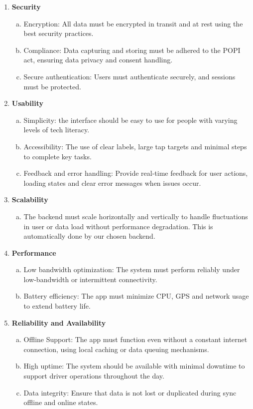 \documentclass[a4paper,12pt]{article}
\begin{document}
\begin{enumerate}
    \item \textbf{Security}
    \begin{enumerate}[a.]
        \item Encryption: All data must be encrypted in transit and at rest using the best security practices.
        \item Compliance: Data capturing and storing must be adhered to the POPI act, ensuring data privacy and consent handling.
        \item Secure authentication: Users must authenticate securely, and sessions must be protected.
    \end{enumerate}

    \item \textbf{Usability}
    \begin{enumerate}[a.]
        \item Simplicity: the interface should be easy to use for people with varying levels of tech literacy.
        \item Accessibility: The use of clear labels, large tap targets and minimal steps to complete key tasks.
        \item Feedback and error handling: Provide real-time feedback for user actions, loading states and clear error messages when issues occur.
    \end{enumerate}

    \item \textbf{Scalability}
    \begin{enumerate}[a.]
        \item The backend must scale horizontally and vertically to handle fluctuations in user or data load without performance degradation. This is automatically done by our chosen backend.
    \end{enumerate}

    \item \textbf{Performance}
    \begin{enumerate}[a.]
        \item Low bandwidth optimization: The system must perform reliably under low-bandwidth or intermittent connectivity.
        \item Battery efficiency: The app must minimize CPU, GPS and network usage to extend battery life.
    \end{enumerate}

    \item \textbf{Reliability and Availability}
    \begin{enumerate}[a.]
        \item Offline Support: The app must function even without a constant internet connection, using local caching or data queuing mechanisms.
        \item High uptime: The system should be available with minimal downtime to support driver operations throughout the day.
        \item Data integrity: Ensure that data is not lost or duplicated during sync offline and online states.
    \end{enumerate}


\end{enumerate}
\end{document}
